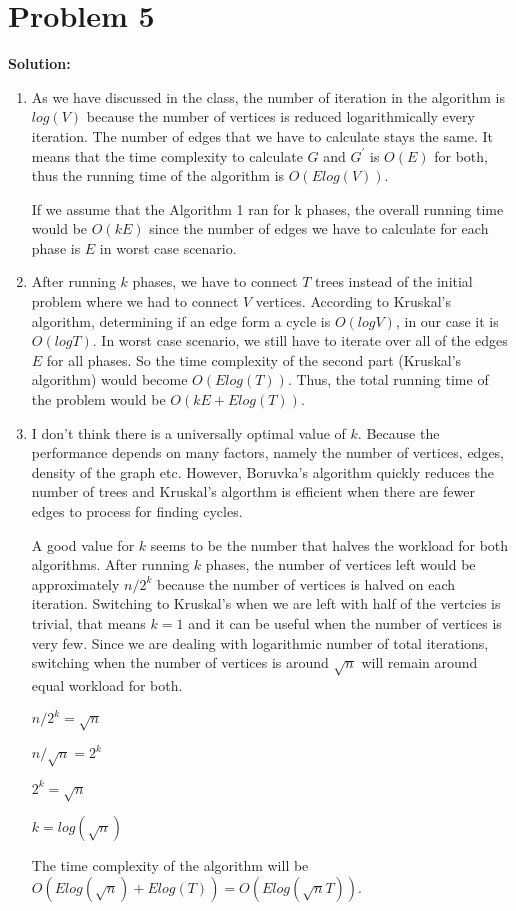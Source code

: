 \documentclass{article}
\begin{document}
\section*{Problem 5}
\textbf{Solution:}

\begin{enumerate}

  \item As we have discussed in the class, the number of iteration in the algorithm is $log(V)$ because the number of vertices is reduced logarithmically every iteration. The number of edges that we have to calculate stays the same. It means that the time complexity to calculate $G$ and $G^\prime$ is $O(E)$ for both, thus the running time of the algorithm is $O(Elog(V))$.
  
  If we assume that the Algorithm 1 ran for k phases, the overall running time would be $O(kE)$ since the number of edges we have to calculate for each phase is $E$ in worst case scenario.
  
  \item After running $k$ phases, we have to connect $T$ trees instead of the initial problem where we had to connect $V$ vertices. According to Kruskal's algorithm, determining if an edge form a cycle is $O(logV)$, in our case it is $O(logT)$. In worst case scenario, we still have to iterate over all of the edges $E$ for all phases. So the time complexity of the second part (Kruskal's algorithm) would become $O(Elog(T))$. Thus, the total running time of the problem would be $O(kE + Elog(T))$.

  \item I don't think there is a universally optimal value of $k$. Because the performance depends on many factors, namely the number of vertices, edges, density of the graph etc. However, Boruvka's algorithm quickly reduces the number of trees and Kruskal's algorthm is efficient when there are fewer edges to process for finding cycles.

  A good value for $k$ seems to be the number that halves the workload for both algorithms. After running $k$ phases, the number of vertices left would be approximately $n/2^k$ because the number of vertices is halved on each iteration. Switching to Kruskal's when we are left with half of the vertcies is trivial, that means $k=1$ and it can be useful when the number of vertices is very few. Since we are dealing with logarithmic number of total iterations, switching when the number of vertices is around $\sqrt{n}$ will remain around equal workload for both.

  \qquad $n/2^k = \sqrt{n}$

  \qquad $n/\sqrt{n} = 2^k$

  \qquad $2^k=\sqrt{n}$

  \qquad $k=log(\sqrt{n})$

  The time complexity of the algorithm will be $O(Elog(\sqrt{n}) + Elog(T))=O(Elog(\sqrt{n}T))$.

\end{enumerate}
\end{document}
